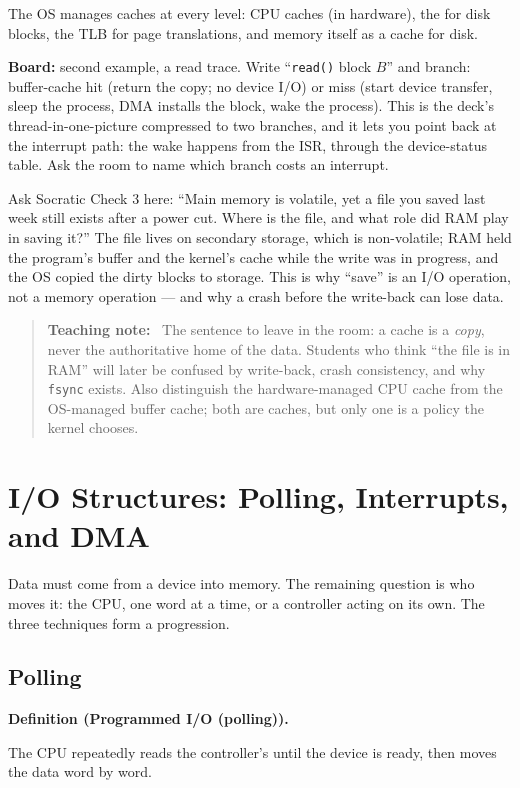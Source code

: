 \documentclass[11pt]{article}
\newenvironment{definitionbox}[1]{%
  \par\noindent\textbf{Definition (#1).}\ \itshape
}{\par\vspace{0.3em}}
\newenvironment{teachingaside}{\begin{quote}\small\color{primary-gold}\textbf{Teaching note:}\ }{\end{quote}}
\begin{document}
The OS manages caches at every level: CPU caches (in hardware), the
 for disk blocks, the TLB for page translations, and memory
itself as a cache for disk.

\textbf{Board:} second example, a read trace. Write ``\texttt{read()} block $B$''
and branch: buffer-cache hit (return the copy; no device I/O) or miss (start
device transfer, sleep the process, DMA installs the block, wake the process).
This is the deck's thread-in-one-picture compressed to two branches, and it lets
you point back at the interrupt path: the wake happens from the ISR, through the
device-status table. Ask the room to name which branch costs an interrupt.

Ask Socratic Check 3 here: ``Main memory is volatile, yet a file you saved last
week still exists after a power cut. Where is the file, and what role did RAM
play in saving it?'' The file lives on secondary storage, which is non-volatile;
RAM held the program's buffer and the kernel's cache while the write was in
progress, and the OS copied the dirty blocks to storage. This is why ``save'' is
an I/O operation, not a memory operation --- and why a crash before the
write-back can lose data.

\begin{teachingaside}
The sentence to leave in the room: a cache is a \emph{copy}, never the
authoritative home of the data. Students who think ``the file is in RAM'' will
later be confused by write-back, crash consistency, and why \texttt{fsync}
exists. Also distinguish the hardware-managed CPU cache from the OS-managed
buffer cache; both are caches, but only one is a policy the kernel chooses.
\end{teachingaside}

\section{I/O Structures: Polling, Interrupts, and DMA}

Data must come from a device into memory. The remaining question is who moves it:
the CPU, one word at a time, or a controller acting on its own. The three
techniques form a progression.

\subsection*{Polling}

\begin{definitionbox}{Programmed I/O (polling)}
The CPU repeatedly reads the controller's  until the device
is ready, then moves the data word by word.
\end{definitionbox}
\end{document}
